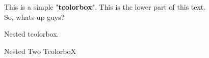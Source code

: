 \documentclass[11 pt]{article}
\begin{document}
 \begin{tcolorbox}[title = Title Bar, colback = blue!21, colframe = black!90]
  This is a simple "\textbf{tcolorbox}".
  \tcblower
  This is the lower part of this text.\\So, whats up guys?
  
   \begin{tcolorbox}[title = NEST, colframe = blue!99]
    Nested tcolorbox.
    	\begin{tcolorbox}
    		Nested Two TcolorboX
    	\end{tcolorbox}
   \end{tcolorbox}
   
 \end{tcolorbox}
 
 
 \begin{tcolorbox}
 \end{tcolorbox}
 
\end{document}
